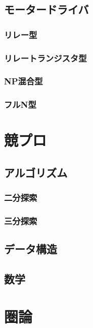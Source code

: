 \documentclass{jarticle}
\begin{document}
   \subsection{モータードライバ}
      \subsubsection{リレー型}
      \subsubsection{リレートランジスタ型}
      \subsubsection{NP混合型}
      \subsubsection{フルN型}
\section{競プロ}
   \subsection{アルゴリズム}
      \subsubsection{二分探索}
      \subsubsection{三分探索}
   \subsection{データ構造}
   \subsection{数学}
\section{圏論}
\end{document}
